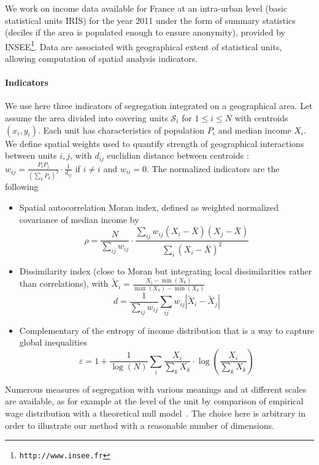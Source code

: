 \documentclass[runningheads,a4paper]{llncs2e/llncs}
\begin{document}
We work on income data available for France at an intra-urban level (basic statistical units IRIS) for the year 2011 under the form of summary statistics (deciles if the area is populated enough to ensure anonymity), provided by INSEE\footnote{\texttt{http://www.insee.fr}}. Data are associated with geographical extent of statistical units, allowing computation of spatial analysis indicators. 

\paragraph{Indicators}

We use here three indicators of segregation integrated on a geographical area. Let assume the area divided into covering units $\mathcal{S}_i$ for $1\leq i \leq N$ with centroids $(x_i,y_i)$. Each unit has characteristics of population $P_i$ and median income $X_i$. We define spatial weights used to quantify strength of geographical interactions between units $i,j$, with $d_{ij}$ euclidian distance between centroids : $w_{ij} = \frac{P_i P_j}{\left(\sum_k P_k\right)^2}\cdot \frac{1}{d_{ij}}$ if $i\neq i$ and $w_{ii} = 0$. The normalized indicators are the following

\begin{itemize}
\item Spatial autocorrelation Moran index, defined as weighted normalized covariance of median income by
\[
\rho = \frac{N}{\sum_{ij}w_{ij}}\cdot \frac{\sum_{ij}w_{ij}\left(X_i - \bar{X}\right)\left(X_j - \bar{X}\right)}{\sum_i \left(X_i - \bar{X}\right)^2}
\]
\item Dissimilarity index (close to Moran but integrating local dissimilarities rather than correlations), with $\tilde{X}_i = \frac{X_i - \min(X_k)}{\max(X_k) - \min(X_k)}$
\[
d =  \frac{1}{\sum_{ij}w_{ij}} \sum_{ij} w_{ij} \left|\tilde{X}_i - \tilde{X}_j\right|
\]
\item Complementary of the entropy of income distribution that is a way to capture global inequalities
\[
\varepsilon = 1 + \frac{1}{\log(N)} \sum_i \frac{X_i}{\sum_k X_k} \cdot \log\left(\frac{X_i}{\sum_k X_k}\right)
\]
\end{itemize}

Numerous measures of segregation with various meanings and at different scales are available, as for example at the level of the unit by comparison of empirical wage distribution with a theoretical null model~\cite{louf2015patterns}. The choice here is arbitrary in order to illustrate our method with a reasonable number of dimensions.
\end{document}
